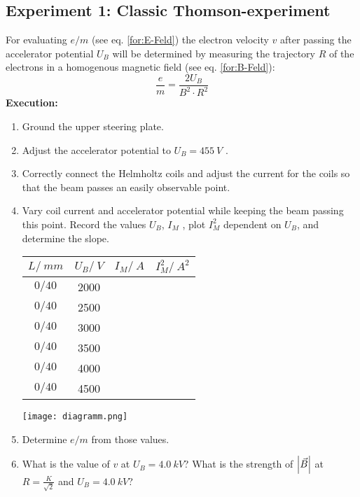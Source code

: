 \documentclass{tudphygp_eng}
\begin{document}
\subsection{Experiment 1: Classic Thomson-experiment}
  For evaluating $e/m$ (see eq. \eqref{for:E-Feld}) the electron velocity $v$ after passing the accelerator potential $U_B$ will be determined by measuring the trajectory $R$ of the electrons in a homogenous magnetic field (see eq. 
  \eqref{for:B-Feld}):
  \begin{equation}
    \frac{e}{m} = \frac{2U_B}{B^2\cdot R^2}
  \end{equation}
  \textbf{Execution:}
  \begin{enumerate}
    \item Ground the upper steering plate.
    \item Adjust the accelerator potential to $U_B=\SI{455}{V}$ .
    \item Correctly connect the Helmholtz coils and adjust the current for the coils so that the beam passes an easily observable point.
    \item Vary coil current and accelerator potential while keeping the beam passing this point. Record the values $U_B$, $I_M$ , plot $I_M^2$ dependent on $U_B$, and determine the slope.\\
    \begin{minipage}{0.45\textwidth}
    \centering
    \begin{tabular}{|c|c|c|c|}\hline
      $L/\SI{}{mm}$ & $U_B/\SI{}{V}$ & \hspace{10pt}$I_M/\SI{}{A}$\hspace{10pt} & \hspace{10pt}$I_M^2/\SI{}{A^2}$\hspace{10pt} \\\hline
      $0/40$        &     2000       &                &                   \\
      $0/40$        &     2500       &                &                   \\
      $0/40$        &     3000       &                &                   \\
      $0/40$        &     3500       &                &                   \\
      $0/40$        &     4000       &                &                   \\
      $0/40$        &     4500       &                &                   \\\hline
    \end{tabular}
    \end{minipage}
    \hfill
    \begin{minipage}{0.45\textwidth}
    \centering
    \texttt{[image: diagramm.png]}
    \end{minipage}
    \item Determine $e/m$ from those values.
    \item What is the value of $v$ at $U_B=\SI{4.0}{kV}$? What is the strength of $\left|\vec B\right|$ at $R=\frac{K}{\sqrt{2}}$ and $U_B=\SI{4.0}{kV}$?
  \end{enumerate}
  
\end{document}
